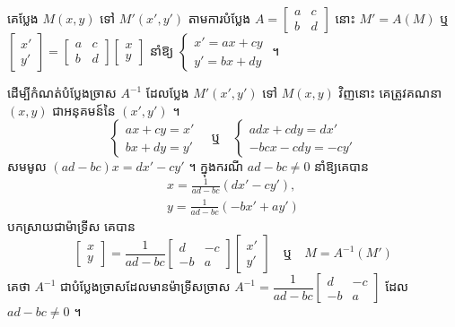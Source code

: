 \begin{formulaBox}[ជាទូទៅ]
គេប្លែង $M(x, y)$ ទៅ $M'(x', y')$ តាមការបំប្លែង $A = \begin{bmatrix} a & c\\ b & d \end{bmatrix}$ នោះ $M' = A(M)$ ឬ $\begin{bmatrix} x'\\ y' \end{bmatrix} = \begin{bmatrix} a & c\\ b & d \end{bmatrix}\begin{bmatrix} x\\ y \end{bmatrix}$ នាំឱ្យ $\begin{cases} x' = ax + cy\\ y' = bx + dy \end{cases}$ ។
\end{formulaBox}

ដើម្បីកំណត់បំប្លែងច្រាស $A^{-1}$ ដែលប្លែង $M'(x', y')$ ទៅ $M(x, y)$ វិញនោះ គេត្រូវគណនា $(x, y)$ ជាអនុគមន៍នៃ $(x', y')$ ។
\[ \begin{cases} ax + cy = x'\\ bx + dy = y' \end{cases} \quad\text{ឬ}\quad \begin{cases} adx + cdy = dx'\\ -bcx - cdy = -cy' \end{cases} \]
សមមូល $(ad - bc)x = dx' - cy'$ ។ ក្នុងករណី $ad - bc \ne 0$ នាំឱ្យគេបាន
\[
\begin{gathered}
x = \frac{1}{ad - bc}(dx' - cy'),\\
y = \frac{1}{ad - bc}(-bx' + ay')
\end{gathered}
\]
បកស្រាយជាម៉ាទ្រីស គេបាន
\[ \begin{bmatrix} x\\ y \end{bmatrix} = \frac{1}{ad - bc}\begin{bmatrix} d & -c\\ -b & a \end{bmatrix}\begin{bmatrix} x'\\ y' \end{bmatrix} \quad\text{ឬ}\quad M = A^{-1}(M') \]
គេថា $A^{-1}$ ជាបំប្លែងច្រាសដែលមានម៉ាទ្រីសច្រាស $A^{-1} = \dfrac{1}{ad - bc}\begin{bmatrix} d & -c\\ -b & a \end{bmatrix}$ ដែល $ad - bc \ne 0$ ។

